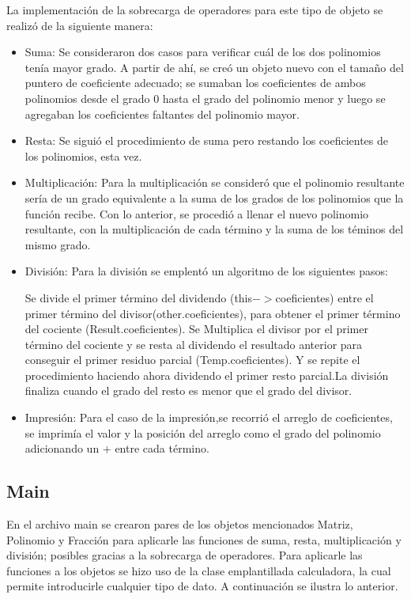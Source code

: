 \documentclass[11pt]{article}
\begin{document}
La implementación de la sobrecarga de operadores para este tipo de objeto se realizó de la siguiente manera:
\begin{itemize}
\item Suma: Se consideraron dos casos para verificar cuál de los dos polinomios tenía mayor grado. A partir de ahí, se creó un objeto nuevo con el tamaño del puntero de  coeficiente adecuado; se sumaban los coeficientes de ambos polinomios desde el grado 0 hasta el grado del polinomio menor y luego se agregaban los coeficientes faltantes del polinomio mayor.
\item Resta: Se siguió el procedimiento de suma pero restando los coeficientes de los polinomios, esta vez.
\item Multiplicación: Para la multiplicación se consideró que el polinomio resultante sería de un grado equivalente a la suma de los grados de los polinomios que la función recibe. Con lo anterior, se procedió a llenar el nuevo polinomio resultante, con la multiplicación de cada término y la suma de los téminos del mismo grado.
\item División: Para la división se emplentó un algoritmo de los siguientes pasos:

Se divide el primer término del dividendo (this$->$coeficientes) entre el primer término del divisor(other.coeficientes), para obtener el primer término del cociente (Result.coeficientes). Se Multiplica el divisor por el primer término del cociente y se resta al dividendo el resultado anterior para conseguir el primer residuo parcial (Temp.coeficientes). 
Y se repite el procedimiento haciendo ahora dividendo el primer resto parcial.La división finaliza cuando el grado del resto es menor que el grado del divisor. 
\item Impresión: Para el caso de la impresión,se recorrió el arreglo de coeficientes, se imprimía el valor y la posición del arreglo como el grado del polinomio adicionando un $+$ entre cada término.
\end{itemize}
\subsection{Main}
En el archivo main se crearon pares de los objetos mencionados Matriz, Polinomio y Fracción para aplicarle las funciones de suma, resta, multiplicación y división; posibles gracias a la sobrecarga de operadores. Para aplicarle las funciones a los objetos se hizo uso de la clase emplantillada calculadora, la cual permite introducirle cualquier tipo de dato. A continuación se ilustra lo anterior.
\end{document}
